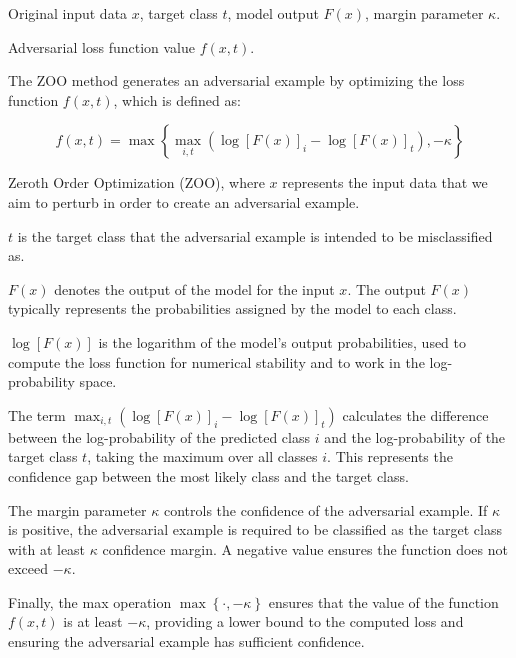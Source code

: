 Original input data $x$, target class $t$, model output $F(x)$, margin parameter $\kappa$.

Adversarial loss function value $f(x, t)$.

The ZOO method generates an adversarial example by optimizing the loss function $f(x, t)$, which is defined as:

\[
f(x, t) = \max \left\{ \max_{i, t} \left( \log[F(x)]_i - \log[F(x)]_t \right), -\kappa \right\}
\]

Zeroth Order Optimization (ZOO), where $x$ represents the input data that we aim to perturb in order to create an adversarial example.

$t$ is the target class that the adversarial example is intended to be misclassified as.

$F(x)$ denotes the output of the model for the input $x$. The output $F(x)$ typically represents the probabilities assigned by the model to each class.

$\log[F(x)]$ is the logarithm of the model's output probabilities, used to compute the loss function for numerical stability and to work in the log-probability space.

The term $\max_{i, t} \left( \log[F(x)]_i - \log[F(x)]_t \right)$ calculates the difference between the log-probability of the predicted class $i$ and the log-probability of the target class $t$, taking the maximum over all classes $i$. This represents the confidence gap between the most likely class and the target class.

The margin parameter $\kappa$ controls the confidence of the adversarial example. If $\kappa$ is positive, the adversarial example is required to be classified as the target class with at least $\kappa$ confidence margin. A negative value ensures the function does not exceed $-\kappa$.

Finally, the max operation $\max \left\{ \cdot, -\kappa \right\}$ ensures that the value of the function $f(x, t)$ is at least $-\kappa$, providing a lower bound to the computed loss and ensuring the adversarial example has sufficient confidence.
